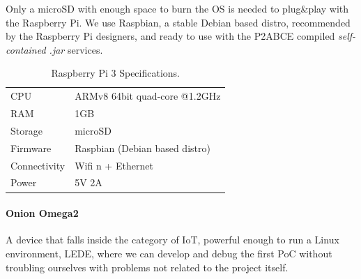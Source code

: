 Only a microSD with enough space to burn the OS is needed to plug\&play with the Raspberry Pi. We use Raspbian, a stable Debian based distro, recommended by the Raspberry Pi designers, and ready to use with the P2ABCE compiled \textit{self-contained .jar} services.

\begin{table}[h]
	\myfloatalign
	\begin{tabularx}{0.75\textwidth}{ll} \toprule
		CPU & ARMv8 64bit quad-core @1.2GHz \\
		RAM & 1GB \\
		Storage & microSD \\
		Firmware & Raspbian (Debian based distro) \\
		Connectivity & Wifi n + Ethernet \\
		Power & 5V 2A \\
		\bottomrule
	\end{tabularx}
	\caption[Raspberry Pi 3 Specifications]{Raspberry Pi 3 Specifications.}
	\label{tab:RPi3Specs}
\end{table}


\paragraph{Onion Omega2} A device that falls inside the category of IoT, powerful enough to run a Linux environment, LEDE, where we can develop and debug the first PoC without troubling ourselves with problems not related to the project itself.


